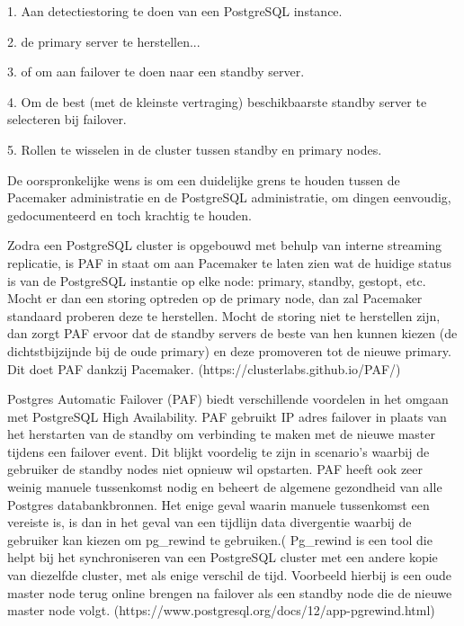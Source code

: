 1. Aan detectiestoring te doen van een PostgreSQL instance.

2. de primary server te herstellen...

3. of om aan failover te doen naar een standby server.

4. Om de best (met de kleinste vertraging) beschikbaarste standby server te selecteren bij failover.

5. Rollen te wisselen in de cluster tussen standby en primary nodes.


De oorspronkelijke wens is om een duidelijke grens te houden tussen de Pacemaker administratie en de PostgreSQL administratie, om dingen eenvoudig, gedocumenteerd en toch krachtig te houden.

Zodra een PostgreSQL cluster is opgebouwd met behulp van interne streaming replicatie, is PAF in staat om aan Pacemaker te laten zien wat de huidige status is van de PostgreSQL instantie op elke node: primary, standby, gestopt, etc. Mocht er dan een storing optreden op de primary node, dan zal Pacemaker standaard proberen deze te herstellen. Mocht de storing niet te herstellen zijn, dan zorgt PAF ervoor dat de standby servers de beste van hen kunnen kiezen (de dichtstbijzijnde bij de oude primary) en deze promoveren tot de nieuwe primary. Dit doet PAF dankzij Pacemaker. (https://clusterlabs.github.io/PAF/)

Postgres Automatic Failover (PAF) biedt verschillende voordelen in het omgaan met PostgreSQL High Availability. PAF gebruikt IP adres failover in plaats van het herstarten van de standby om verbinding te maken met de nieuwe master tijdens een failover event. Dit blijkt voordelig te zijn in scenario's waarbij de gebruiker de standby nodes niet opnieuw wil opstarten. PAF heeft ook zeer weinig manuele tussenkomst nodig en beheert de algemene gezondheid van alle Postgres databankbronnen. Het enige geval waarin manuele tussenkomst een vereiste is, is dan in het geval van een tijdlijn data divergentie waarbij de gebruiker kan kiezen om pg\_rewind te gebruiken.(%
Pg\_rewind is een tool die helpt bij het synchroniseren van een PostgreSQL cluster met een andere kopie van diezelfde cluster, met als enige verschil de tijd. Voorbeeld hierbij is een oude master node terug online brengen na failover als een standby node die de nieuwe master node volgt. (https://www.postgresql.org/docs/12/app-pgrewind.html)

\subsection{}
\label{subsec:RepMgr [Replication Manager]}


